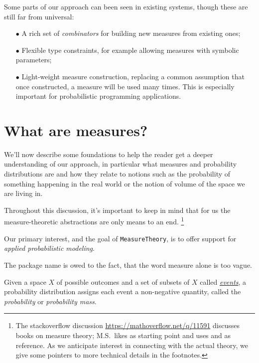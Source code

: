 \documentclass{juliacon}
\begin{document}
Some parts of our approach can been seen in existing systems, though these are still far from universal:
\begin{itemize}
    \item[$\bullet\!$] A rich set of \emph{combinators} for building new measures from existing ones;
    \item[$\bullet\!$] Flexible type constraints, for example allowing measures with symbolic parameters;
    \item[$\bullet\!$] Light-weight measure construction, replacing a common assumption that once constructed, a measure will be used many times. This is especially important for probabilistic programming applications.
\end{itemize}

\section{What are measures?}

We'll now describe some foundations to help the reader get a deeper understanding of our approach, in particular what measures and probability distributions are and how they relate to notions such as the probability of something happening in the real world or the notion of volume of the space we are living in. 

Throughout this discussion, it's important to keep in mind that for us the measure-theoretic abstractions are only means to an end.%
\footnote{The stackoverflow discussion \url{https://mathoverflow.net/q/11591} discusses books on measure theory; M.S.~likes \cite{Shiryaev1996} as starting point and uses \cite{Elstrodt2011} and \cite{Bauer_Heinz1982-01-01} as reference. As we anticipate interest in connecting with the actual theory, we give some pointers to more technical details in the footnotes.}

Our primary interest, and the goal of \verb|MeasureTheory|, is to offer support for \emph{applied probabilistic modeling}.

The package name is owed to the fact, that the word measure alone is too vague.

Given a space $X$ of possible outcomes and a set of subsets of $X$ called \href{https://en.wikipedia.org/wiki/Event_(probability_theory)}{\emph{events}}, a probability distribution assigns each event a non-negative quantity, called the \emph{probability} or \emph{probability mass}.
\end{document}
